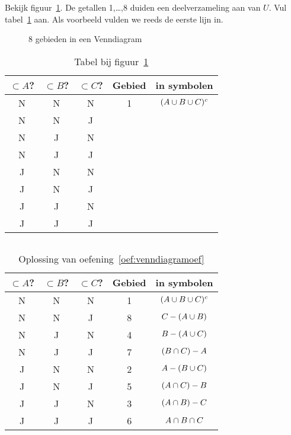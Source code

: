 \begin{oef}
\label{oef:venndiagramoef}
Bekijk figuur~\ref{fig:venndiagramoef}. De getallen 1,\dots,8 duiden een deelverzameling aan van $U$. Vul  tabel~\ref{tab:venndiagram} aan. Als voorbeeld vulden we reeds de eerste lijn in.
\begin{figure}[htbp]
\centering

\caption{8 gebieden in een Venndiagram}
\label{fig:venndiagramoef}
\end{figure}
\begin{table}[h!tbp]
\centering
\caption{Tabel bij figuur~\ref{fig:venndiagramoef}}
\begin{tabular}{ccccc}
\toprule
$\subset A$? & $\subset B$? & $\subset C$? & Gebied & in symbolen \\ 
\midrule
N & N & N & 1  & $(A \cup B \cup C)^c$ \\ 
N & N & J &  &   \\ 
N & J & N &   &   \\ 
N & J & J &   &   \\ 
J & N & N &   &   \\ 
J & N & J &   &   \\ 
J & J & N &   &   \\ 
J & J & J &   &   \\ 
\bottomrule
\end{tabular} 
\label{tab:venndiagram}
\end{table}

\begin{opl}
$\qquad$ \\
\begin{table}[h!tbp]
\centering
\caption{Oplossing van oefening~\ref{oef:venndiagramoef}}
\begin{tabular}{ccccc}
\toprule
$\subset A$? & $\subset B$? & $\subset C$? & Gebied & in symbolen \\ 
\midrule
N & N & N & 1  & $(A\cup B \cup C)^c$ \\ 
N & N & J & 8 & $C-(A\cup B)$  \\ 
N & J & N &  4 & $B-(A\cup C)$  \\ 
N & J & J &7   &$(B\cap C)-A$   \\ 
J & N & N &  2 & $A-(B\cup C)$  \\ 
J & N & J & 5  & $(A\cap C)-B$  \\ 
J & J & N & 3  & $(A\cap B)-C$  \\ 
J & J & J & 6  & $A\cap B\cap C$  \\ 
\bottomrule
\end{tabular} 
\label{tab:venndiagram2}
\end{table}

\end{opl}
\end{oef}




